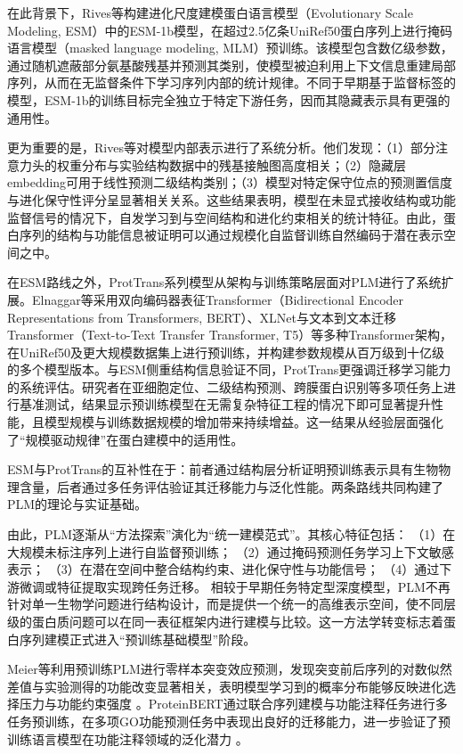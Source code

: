 在此背景下，Rives等构建进化尺度建模蛋白语言模型（Evolutionary Scale Modeling, ESM）中的ESM-1b模型，在超过2.5亿条UniRef50蛋白序列上进行掩码语言模型（masked language modeling, MLM）预训练\cite{rives2021biological}。该模型包含数亿级参数，通过随机遮蔽部分氨基酸残基并预测其类别，使模型被迫利用上下文信息重建局部序列，从而在无监督条件下学习序列内部的统计规律。不同于早期基于监督标签的模型，ESM-1b的训练目标完全独立于特定下游任务，因而其隐藏表示具有更强的通用性。

更为重要的是，Rives等对模型内部表示进行了系统分析。他们发现：（1）部分注意力头的权重分布与实验结构数据中的残基接触图高度相关；（2）隐藏层embedding可用于线性预测二级结构类别；（3）模型对特定保守位点的预测置信度与进化保守性评分呈显著相关关系。这些结果表明，模型在未显式接收结构或功能监督信号的情况下，自发学习到与空间结构和进化约束相关的统计特征。由此，蛋白序列的结构与功能信息被证明可以通过规模化自监督训练自然编码于潜在表示空间之中。

在ESM路线之外，ProtTrans系列模型从架构与训练策略层面对PLM进行了系统扩展\cite{elnaggar2022prottrans}。Elnaggar等采用双向编码器表征Transformer（Bidirectional Encoder Representations from Transformers, BERT）、XLNet与文本到文本迁移Transformer（Text-to-Text Transfer Transformer, T5）等多种Transformer架构，在UniRef50及更大规模数据集上进行预训练，并构建参数规模从百万级到十亿级的多个模型版本。与ESM侧重结构信息验证不同，ProtTrans更强调迁移学习能力的系统评估。研究者在亚细胞定位、二级结构预测、跨膜蛋白识别等多项任务上进行基准测试，结果显示预训练模型在无需复杂特征工程的情况下即可显著提升性能，且模型规模与训练数据规模的增加带来持续增益。这一结果从经验层面强化了“规模驱动规律”在蛋白建模中的适用性。

ESM与ProtTrans的互补性在于：前者通过结构层分析证明预训练表示具有生物物理含量，后者通过多任务评估验证其迁移能力与泛化性能。两条路线共同构建了PLM的理论与实证基础。

由此，PLM逐渐从“方法探索”演化为“统一建模范式”。其核心特征包括：
（1）在大规模未标注序列上进行自监督预训练；
（2）通过掩码预测任务学习上下文敏感表示；
（3）在潜在空间中整合结构约束、进化保守性与功能信号；
（4）通过下游微调或特征提取实现跨任务迁移。
相较于早期任务特定型深度模型，PLM不再针对单一生物学问题进行结构设计，而是提供一个统一的高维表示空间，使不同层级的蛋白质问题可以在同一表征框架内进行建模与比较。这一方法学转变标志着蛋白序列建模正式进入“预训练基础模型”阶段。

Meier等利用预训练PLM进行零样本突变效应预测，发现突变前后序列的对数似然差值与实验测得的功能改变显著相关，表明模型学习到的概率分布能够反映进化选择压力与功能约束强度 \cite{meier2021language}。ProteinBERT通过联合序列建模与功能注释任务进行多任务预训练，在多项GO功能预测任务中表现出良好的迁移能力，进一步验证了预训练语言模型在功能注释领域的泛化潜力 \cite{brandes2022proteinbert}。

